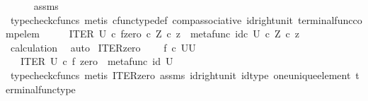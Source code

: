 \begin{isabellebody}
\ \ \ \ \isamarkupfalse%
\ assms\ \isamarkupfalse%
\ {\isacharparenleft}{\kern0pt}typecheck{\isacharunderscore}{\kern0pt}cfuncs{\isacharcomma}{\kern0pt}\ metis\ cfunc{\isacharunderscore}{\kern0pt}type{\isacharunderscore}{\kern0pt}def\ comp{\isacharunderscore}{\kern0pt}associative\ id{\isacharunderscore}{\kern0pt}right{\isacharunderscore}{\kern0pt}unit{}\ terminal{\isacharunderscore}{\kern0pt}func{\isacharunderscore}{\kern0pt}comp{\isacharunderscore}{\kern0pt}elem{\isacharparenright}{\kern0pt}\isanewline
\ \ \isamarkupfalse%
\ \isamarkupfalse%
\ {\isachardoublequoteopen}{\isacharparenleft}{\kern0pt}ITER\ U\ {\isasymcirc}\isactrlsub c\ {\isasymlangle}f{\isacharcomma}{\kern0pt}zero\ {\isasymcirc}\isactrlsub c\ {\isasymbeta}\isactrlbsub Z\isactrlesub {\isasymrangle}{\isacharparenright}{\kern0pt}\ {\isasymcirc}\isactrlsub c\ z\ {\isacharequal}{\kern0pt}\ {\isacharparenleft}{\kern0pt}metafunc\ {\isacharparenleft}{\kern0pt}id\isactrlsub c\ U{\isacharparenright}{\kern0pt}\ {\isasymcirc}\isactrlsub c\ {\isasymbeta}\isactrlbsub Z\isactrlesub {\isacharparenright}{\kern0pt}\ {\isasymcirc}\isactrlsub c\ z{\isachardoublequoteclose}\isanewline
\ \ \ \ \isamarkupfalse%
\ calculation\ \isamarkupfalse%
\ auto\isanewline
{}\isamarkupfalse%
%
\endisatagproof
{\isafoldproof}%
%
\isadelimproof
\isanewline
%
\endisadelimproof
\isanewline
{}\isamarkupfalse%
\ ITER{\isacharunderscore}{\kern0pt}zero{\isacharprime}{\kern0pt}{\isacharcolon}{\kern0pt}\ \isanewline
\ \ \ {\isachardoublequoteopen}f\ {\isasymin}\isactrlsub c\ {\isacharparenleft}{\kern0pt}U\isactrlbsup U\isactrlesup {\isacharparenright}{\kern0pt}{\isachardoublequoteclose}\isanewline
\ \ \ {\isachardoublequoteopen}ITER\ U\ {\isasymcirc}\isactrlsub c\ {\isasymlangle}f{\isacharcomma}{\kern0pt}\ zero{\isasymrangle}\ {\isacharequal}{\kern0pt}\ metafunc\ {\isacharparenleft}{\kern0pt}id\ U{\isacharparenright}{\kern0pt}{\isachardoublequoteclose}\isanewline
%
\isadelimproof
\ \ %
\endisadelimproof
%
\isatagproof
{}\isamarkupfalse%
\ {\isacharparenleft}{\kern0pt}typecheck{\isacharunderscore}{\kern0pt}cfuncs{\isacharcomma}{\kern0pt}\ metis\ ITER{\isacharunderscore}{\kern0pt}zero\ assms\ id{\isacharunderscore}{\kern0pt}right{\isacharunderscore}{\kern0pt}unit{}\ id{\isacharunderscore}{\kern0pt}type\ one{\isacharunderscore}{\kern0pt}unique{\isacharunderscore}{\kern0pt}element\ terminal{\isacharunderscore}{\kern0pt}func{\isacharunderscore}{\kern0pt}type{\isacharparenright}{\kern0pt}%

\end{isabellebody}
